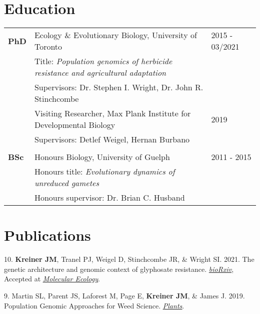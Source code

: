 \documentclass[12pt]{article}
\begin{document}
\section*{Education}

\begin{tabular}{lll}
\textbf{PhD} & Ecology \& Evolutionary Biology, University of Toronto & 2015 - 03/2021\\
& Title: \textit{Population genomics of herbicide resistance and agricultural adaptation}\\
& Supervisors: Dr. Stephen I. Wright, Dr. John R. Stinchcombe\\
& Visiting Researcher, Max Plank Institute for Developmental Biology & 2019 \\
& Supervisors: Detlef Weigel, Hernan Burbano \\
\\
\textbf{BSc} &  Honours Biology, University of Guelph & 2011 - 2015\\ %
& Honours title: \textit{Evolutionary dynamics of unreduced gametes}  \\
& Honours supervisor: Dr. Brian C. Husband\\
\end{tabular}


\section*{Publications}

\noindent\hspace{.1cm}10. \textbf{Kreiner JM}, Tranel PJ, Weigel D, Stinchcombe JR, \& Wright SI. 2021. The genetic architecture and genomic context of glyphosate resistance. \href{https://www.biorxiv.org/content/10.1101/2020.08.19.257972v1}{\textit{bioRxiv}}, Accepted at \href{https://onlinelibrary.wiley.com/doi/epdf/10.1111/mec.15920}{\underline{\textit{Molecular Ecology}}}.\medskip

\noindent\hspace{.1cm}9. Martin SL, Parent JS, Laforest M, Page E, \textbf{Kreiner JM}, \& James J. 2019. Population Genomic Approaches for Weed Science. \href{https://doi.org/10.3390/plants8090354}{\underline{\textit{Plants}}}. 
\medskip
\end{document}
